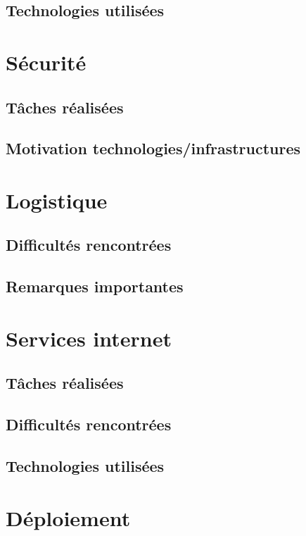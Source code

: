\documentclass{article}
\begin{document}
\subsection{Technologies utilisées}

 
\section{Sécurité}
    \subsection{Tâches réalisées} 
   
    \subsection{Motivation technologies/infrastructures} 
   
\section{Logistique}
   
    \subsection{Difficultés rencontrées}
    
    \subsection{Remarques importantes}
    
\section{Services internet}
    \subsection{Tâches réalisées} 
   
    \subsection{Difficultés rencontrées} 
    
    \subsection{Technologies utilisées}
   
\section{Déploiement}
\end{document}
